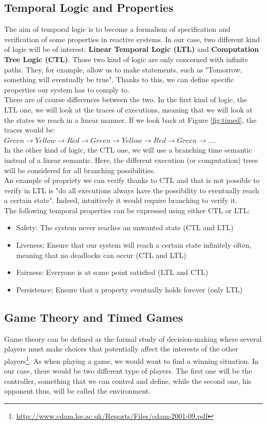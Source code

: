 \subsection{Temporal Logic and Properties}
The aim of temporal logic is to become a formalism of specification and verification of some properties in reactive systems. In our case, two different kind of logic will be of interest: \textbf{Linear Temporal Logic (LTL)} and \textbf{Computation Tree Logic (CTL)}. Those two kind of logic are only concerned with infinite paths. They, for example, allow us to make statements, such as "Tomorrow, something will eventually be true". Thanks to this, we can define specific properties our system has to comply to. \\
There are of course differences between the two. In the first kind of logic, the LTL one, we will look at the traces of executions, meaning that we will look at the states we reach in a linear manner.
If we look back at Figure \ref{fig:timed}, the traces would be:\\ ${Green \rightarrow Yellow \rightarrow Red \rightarrow Green \rightarrow Yellow \rightarrow Red \rightarrow Green \rightarrow ...}$. \\
In the other kind of logic, the CTL one, we will use a branching time semantic instead of a linear semantic. Here, the different execution (or computation) trees will be considered for all branching possibilities. \\
An example of propriety we can verify thanks to CTL and that is not possible to verify in LTL is "do all executions always have the possibility to eventually reach a certain state". Indeed, intuitively it would require branching to verify it. \\
The following temporal properties can be expressed using either CTL or LTL:
\begin{itemize}
    \item Safety: The system never reaches an unwanted state (CTL and LTL)
    \item Liveness: Ensure that our system will reach a certain state infinitely often, meaning that no deadlocks can occur (CTL and LTL)
    \item Fairness: Everyone is at some point satisfied (LTL and CTL)
    \item Persistence: Ensure that a property eventually holds forever (only LTL)
\end{itemize}

\subsection{Game Theory and Timed Games} \label{sec:game}
Game theory can be defined as the formal study of decision-making where several players must make choices that potentially affect the interests of the other players\footnote{\url{http://www.cdam.lse.ac.uk/Reports/Files/cdam-2001-09.pdf}}. As when playing a game, we would want to find a winning situation. In our case, there would be two different type of players. The first one will be the controller, something that we can control and define, while the second one, his opponent thus, will be called the environment. \\

